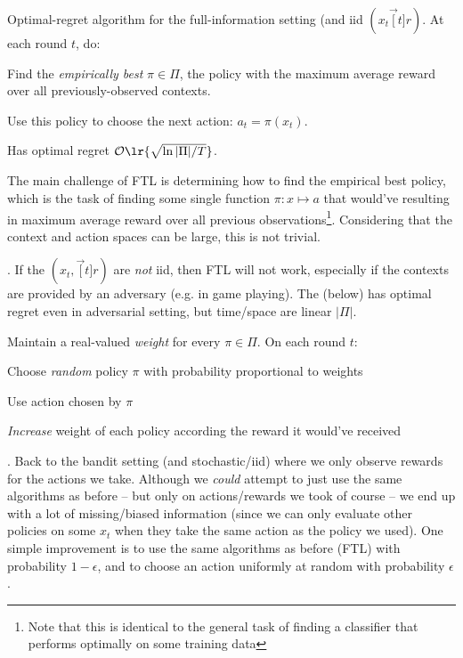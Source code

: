 \documentclass[11pt]{article}
\begin{document}
\begin{algorithm}
	Optimal-regret algorithm for the full-information setting (and iid $(x_t \vec[t]{r})$. At each round $t$, do:
	\begin{compactenum}
		\item Find the \textit{empirically best} $\pi \in \Pi$, the policy with the maximum average reward over all previously-observed contexts. 
		\item Use this policy to choose the next action: $a_t = \pi(x_t)$. 
	\end{compactenum}

	Has optimal regret $\mathcal{O}\lr{\sqrt{\ln | \Pi | / T}}$. 
\end{algorithm}
The main challenge of FTL is determining how to find the empirical best policy, which is the task of finding some single function $\pi: x \mapsto a$ that would've resulting in maximum average reward over all previous observations\footnote{Note that this is identical to the general task of finding a classifier that performs optimally on some training data}. Considering that the context and action spaces can be large, this is not trivial. 


. If the $(x_t, \vec[t]{r})$ are \textit{not} iid, then FTL will not work, especially if the contexts are provided by an adversary (e.g. in game playing). The  (below) has optimal regret even in adversarial setting, but time/space are linear $| \Pi |$. 

\begin{algorithm}
	Maintain a real-valued \textit{weight} for every $\pi \in \Pi$. On each round $t$:
	\begin{compactenum}
		\item Choose \textit{random} policy $\pi$ with probability proportional to weights
		\item Use action chosen by $\pi$ 
		\item \textit{Increase} weight of each policy according the reward it would've received
	\end{compactenum}
\end{algorithm}

. Back to the bandit setting (and stochastic/iid) where we only observe rewards for the actions we take. Although we \textit{could} attempt to just use the same algorithms as before -- but only on actions/rewards we took of course -- we end up with a lot of missing/biased information (since we can only evaluate other policies on some $x_t$ when they take the same action as the policy we used). One simple improvement is to use the same algorithms as before (FTL) with probability $1 - \epsilon$, and to choose an action uniformly at random with probability $\epsilon$. 
\end{document}
